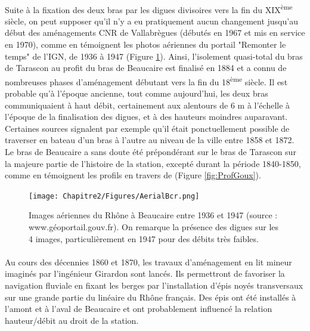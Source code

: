\FloatBarrier
        \paragraph{} Suite à la fixation des deux bras par les digues divisoires vers la fin du XIX\textsuperscript{ème} siècle, on peut supposer qu'il n'y a eu pratiquement aucun changement jusqu'au début des aménagements CNR de Vallabrègues (débutés en 1967 et mis en service en 1970), comme en témoignent les photos aériennes du portail "Remonter le temps" de l'IGN, de 1936 à 1947 (Figure \ref{fig:AerialBcr}). Ainsi, l'isolement quasi-total du bras de Tarascon au profit du bras de Beaucaire est finalisé en 1884 et a connu de nombreuses phases d'aménagement débutant vers la fin du 18\textsuperscript{ème} siècle. Il est probable qu'à l'époque ancienne, tout comme aujourd'hui, les deux bras communiquaient à haut débit, certainement aux alentours de 6 m à l'échelle à l'époque de la finalisation des digues, et à des hauteurs moindres auparavant. Certaines sources signalent par exemple qu'il était ponctuellement possible de traverser en bateau d'un bras à l'autre au niveau de la ville entre 1858 et 1872. Le bras de Beaucaire a sans doute été prépondérant sur le bras de Tarascon sur la majeure partie de l'histoire de la station, excepté durant la période 1840-1850, comme en témoignent les profils en travers de \citet{goux_modification_1851} (Figure \ref{fig:ProfGoux}).
    
        \begin{figure}[h]
            \centering
        	\texttt{[image: Chapitre2/Figures/AerialBcr.png]}
            \caption{Images aériennes du Rhône à Beaucaire entre 1936 et 1947 (source : www.géoportail.gouv.fr). On remarque la présence des digues sur les 4 images, particulièrement en 1947 pour des débits très faibles.}
            \label{fig:AerialBcr}
        \end{figure}
    
		\paragraph{} Au cours des décennies 1860 et 1870, les travaux d'aménagement en lit mineur imaginés par l'ingénieur Girardon sont lancés. Ils permettront de favoriser la navigation fluviale en fixant les berges par l'installation d'épis noyés transversaux sur une grande partie du linéaire du Rhône français. Des épis ont été installés à l'amont et à l'aval de Beaucaire et ont probablement influencé la relation hauteur/débit au droit de la station.
    
